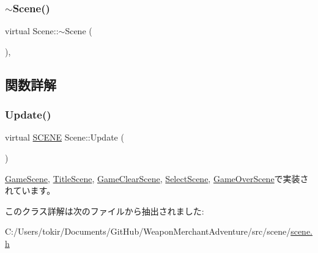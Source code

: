 \subsubsection{\texorpdfstring{$\sim$\+Scene()}{~Scene()}}
{\footnotesize\ttfamily virtual Scene\+::$\sim$\+Scene (\begin{DoxyParamCaption}{ }\end{DoxyParamCaption})\hspace{0.3cm}{\ttfamily [inline]}, {\ttfamily [virtual]}}



\subsection{関数詳解}
\mbox{\label{class_scene_acb50f8104e5a7cfecbdececa7d5f1b39}} 
\subsubsection{\texorpdfstring{Update()}{Update()}}
{\footnotesize\ttfamily virtual \mbox{\hyperlink{scene__base_8h_a24cee5343fb9d0706ead6e8601f363be}{S\+C\+E\+NE}} Scene\+::\+Update (\begin{DoxyParamCaption}{ }\end{DoxyParamCaption})\hspace{0.3cm}{\ttfamily [pure virtual]}}



\mbox{\hyperlink{class_game_scene_a2d4c44e96484af17ed3f6fb0402ebafd}{Game\+Scene}}, \mbox{\hyperlink{class_title_scene_a19f6ee49ca6c8526fb1af2c0a2df9a33}{Title\+Scene}}, \mbox{\hyperlink{class_game_clear_scene_aebea5913506cc86d9570b286e69dfedd}{Game\+Clear\+Scene}}, \mbox{\hyperlink{class_select_scene_a963eef40b6cae9667a66c5a517b66ab8}{Select\+Scene}}, \mbox{\hyperlink{class_game_over_scene_a27d347ed1ff81cbd252e3bcc3f2989a8}{Game\+Over\+Scene}}で実装されています。



このクラス詳解は次のファイルから抽出されました\+:\begin{DoxyCompactItemize}
\item 
C\+:/\+Users/tokir/\+Documents/\+Git\+Hub/\+Weapon\+Merchant\+Adventure/src/scene/\mbox{\hyperlink{scene_8h}{scene.\+h}}\end{DoxyCompactItemize}
